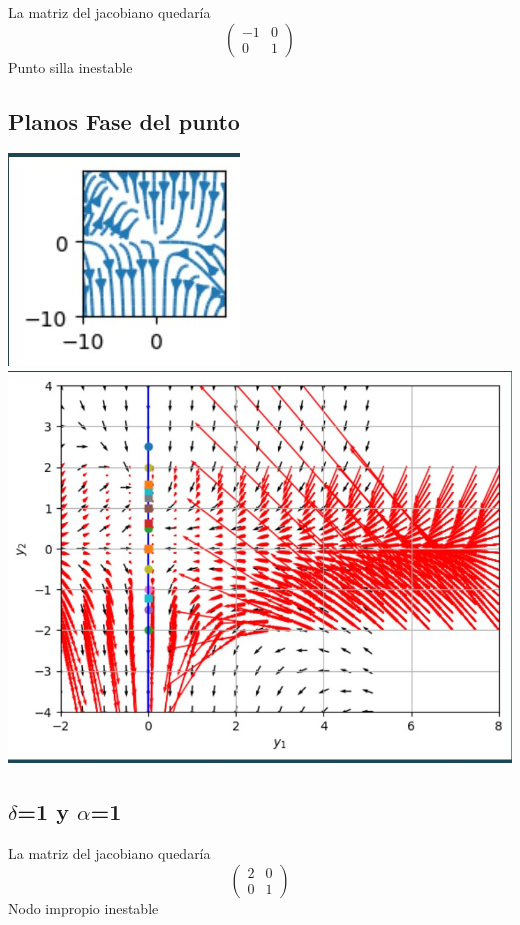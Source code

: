 \documentclass{article}
\begin{document}
        La matriz del jacobiano quedaría
        \[
         \left(
         \begin{array}{lc}
           -1 & 0\\
           0 & 1
         \end{array}
         \right)
         \]         
         Punto silla inestable
         \subsection*{Planos Fase del punto }
         \noindent
         \includegraphics{punto silla inestable isoclinas.jpg}
          \includegraphics{punto silla inestable.jpg}
           
   \subsection*{$\delta$=1 y $\alpha$=1}
       
        La matriz del jacobiano quedaría
        \[
         \left(
         \begin{array}{lc}
           2 & 0\\
           0 & 1
         \end{array}
         \right)
         \]         
         Nodo impropio inestable
\end{document}
